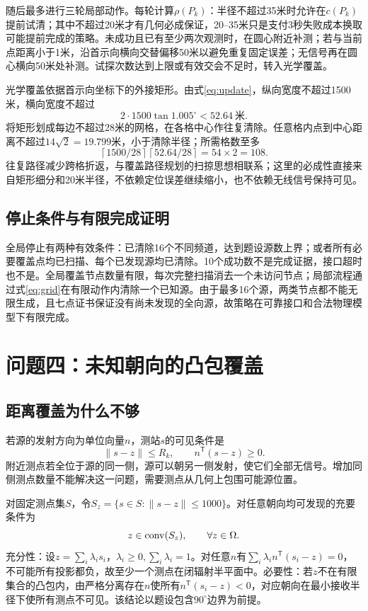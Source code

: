 \documentclass[UTF8,a4paper,zihao=-4,fontset=mac]{ctexart}
\begin{document}
随后最多进行三轮局部动作。每轮计算$\rho(P_k)$：半径不超过35米时允许在$c(P_k)$提前试清；其中不超过20米才有几何必成保证，20--35米只是支付3秒失败成本换取可能提前完成的策略。未成功且已有至少两次观测时，在圆心附近补测；若与当前点距离小于1米，沿首示向横向交替偏移50米以避免重复固定误差；无信号再在圆心横向50米处补测。试探次数达到上限或有效交会不足时，转入光学覆盖。

光学覆盖依据首示向坐标下的外接矩形。由式\eqref{eq:update}，纵向宽度不超过1500米，横向宽度不超过
\begin{equation}
2\cdot1500\tan1.005^\circ<52.64\ \text{米}.
\end{equation}
将矩形划成每边不超过28米的网格，在各格中心作往复清除。任意格内点到中心距离不超过$14\sqrt2=19.799$米，小于清除半径；所需格数至多
\begin{equation}\label{eq:grid}
\left\lceil1500/28\right\rceil
\left\lceil52.64/28\right\rceil=54\times2=108.
\end{equation}
往复路径减少跨格折返，与覆盖路径规划的扫掠思想相联系\cite{choset}；这里的必成性直接来自矩形细分和20米半径，不依赖定位误差继续缩小，也不依赖无线信号保持可见。

\subsection{停止条件与有限完成证明}
全局停止有两种有效条件：已清除16个不同频道，达到题设源数上界；或者所有必要覆盖点均已扫描、每个已发现源均已清除。10个成功数不是完成证据，接口超时也不是。全局覆盖节点数量有限，每次完整扫描消去一个未访问节点；局部流程通过式\eqref{eq:grid}在有限动作内清除一个已知源。由于最多16个源，两类节点都不能无限生成，且七点证书保证没有尚未发现的全向源，故策略在可靠接口和合法物理模型下有限完成。

\section{问题四：未知朝向的凸包覆盖}
\subsection{距离覆盖为什么不够}
若源的发射方向为单位向量$n$，测站$s$的可见条件是
\begin{equation}\label{eq:visibility}
\|s-z\|\le R_k,\qquad n^\mathsf T(s-z)\ge0.
\end{equation}
附近测点若全位于源的同一侧，源可以朝另一侧发射，使它们全部无信号。增加同侧测点数量不能解决这一问题，需要测点从几何上包围可能源位置。

对固定测点集$S$，令$S_z=\{s\in S:\|s-z\|\le1000\}$。对任意朝向均可发现的充要条件为
\begin{equation}\label{eq:hull}
z\in\operatorname{conv}(S_z),\qquad\forall z\in\Omega.
\end{equation}
充分性：设$z=\sum_i\lambda_is_i$，$\lambda_i\ge0,\sum_i\lambda_i=1$。对任意$n$有$\sum_i\lambda_i n^\mathsf T(s_i-z)=0$，不可能所有投影都负，故至少一个测点在闭辐射半平面中。必要性：若$z$不在有限集合的凸包内，由严格分离存在$n$使所有$n^\mathsf T(s_i-z)<0$，对应朝向在最小接收半径下使所有测点不可见。该结论以题设包含$90^\circ$边界为前提。
\end{document}
